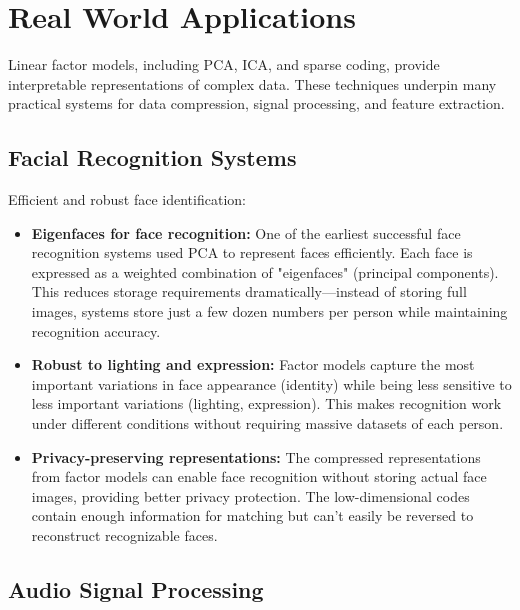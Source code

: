 
\section{Real World Applications}
\label{sec:linear-factor-real-world}


Linear factor models, including PCA, ICA, and sparse coding, provide interpretable representations of complex data. These techniques underpin many practical systems for data compression, signal processing, and feature extraction.

\subsection{Facial Recognition Systems}

Efficient and robust face identification:

\begin{itemize}
    \item \textbf{Eigenfaces for face recognition:} One of the earliest successful face recognition systems used PCA to represent faces efficiently. Each face is expressed as a weighted combination of "eigenfaces" (principal components). This reduces storage requirements dramatically—instead of storing full images, systems store just a few dozen numbers per person while maintaining recognition accuracy.
    
    \item \textbf{Robust to lighting and expression:} Factor models capture the most important variations in face appearance (identity) while being less sensitive to less important variations (lighting, expression). This makes recognition work under different conditions without requiring massive datasets of each person.
    
    \item \textbf{Privacy-preserving representations:} The compressed representations from factor models can enable face recognition without storing actual face images, providing better privacy protection. The low-dimensional codes contain enough information for matching but can't easily be reversed to reconstruct recognizable faces.
\end{itemize}

\subsection{Audio Signal Processing}

